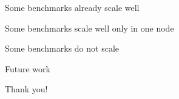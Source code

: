 \documentclass{beamer}
\begin{document}
\begin{frame}
\end{frame}

\begin{frame}
\end{frame}

\begin{frame}{Some benchmarks already scale well}
\end{frame}

\begin{frame}{Some benchmarks scale well only in one node}
\end{frame}

\begin{frame}{Some benchmarks do not scale}
\end{frame}

\begin{frame}{Future work}
\end{frame}

\begin{frame}
	\vspace{50pt}
	\begin{center}
	Thank you!
	\end{center}
\end{frame}
\end{document}
